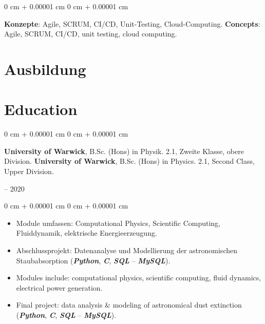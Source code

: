 \documentclass[10pt, letterpaper]{article}
\newenvironment{highlights}{
    \begin{itemize}[
        topsep=0.2 cm,
        parsep=0.2 cm,
        partopsep=0pt,
        itemsep=0.025 cm,
        leftmargin=0 cm + 10pt
    ]
}{
    \end{itemize}
}
\newenvironment{onecolentry}{
    \begin{adjustwidth}{
        0 cm + 0.00001 cm
    }{
        0 cm + 0.00001 cm
    }
}{
    \end{adjustwidth}
}
\newenvironment{twocolentry}[2][]{
    \onecolentry
    \def\secondColumn{#2}
    \setcolumnwidth{\fill, 4.75 cm}
    \begin{paracol}{2}
}{
    \switchcolumn \raggedleft \secondColumn
    \end{paracol}
    \endonecolentry
}
\begin{document}
        \begin{onecolentry}
            \ifdefined\german
            \textbf{Konzepte}: Agile, SCRUM, CI/CD, Unit-Testing, Cloud-Computing.
            \else
            \textbf{Concepts}: Agile, SCRUM, CI/CD, unit testing, cloud computing.
            \fi
        \end{onecolentry}

        \vspace{0.15 cm}

    \newpage

    \ifdefined\german
    \section{Ausbildung}
    \else
    \section{Education}
    \fi
        \begin{twocolentry}{
            2017 – 2020
        }
            \ifdefined\german
            \textbf{University of Warwick}, B.Sc. (Hons) in Physik. 2.1, Zweite Klasse, obere Division.
            \else
            \textbf{University of Warwick}, B.Sc. (Hons) in Physics. 2.1, Second Class, Upper Division.
            \fi
        \end{twocolentry}

        \vspace{0.10 cm}
        \begin{onecolentry}
            \begin{highlights}
                \ifdefined\german
                \item Module umfassen: Computational Physics, Scientific Computing, Fluiddynamik, elektrische Energieerzeugung.
                \item Abschlussprojekt: Datenanalyse und Modellierung der astronomischen Staubabsorption (\textbf{\textit{Python}}, \textbf{\textit{C}}, \textbf{\textit{SQL}} -- \textbf{\textit{MySQL}}).
                \else
                \item Modules include: computational physics, scientific computing, fluid dynamics, electrical power generation.
                \item Final project: data analysis \& modeling of astronomical dust extinction (\textbf{\textit{Python}}, \textbf{\textit{C}}, \textbf{\textit{SQL}} -- \textbf{\textit{MySQL}}).
                \fi
            \end{highlights}
        \end{onecolentry}
        \vspace{0.20 cm}
\end{document}
